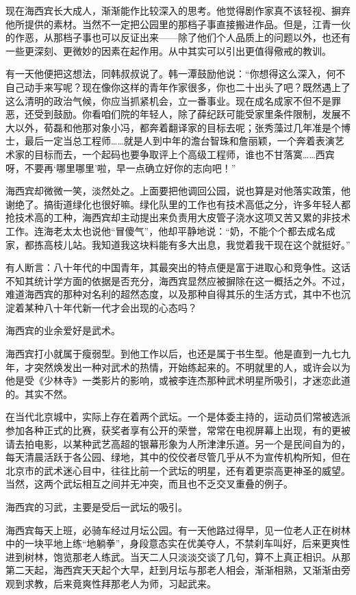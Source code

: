 \par 现在海西宾长大成人，渐渐能作比较深入的思考。他觉得剧作家真不该轻视、摒弃他所提供的素材。当然不一定把公园里的那档子事直接搬进作品。但是，江青一伙的作恶，从那档子事也可以反证出来——除了他们个人品质上的问题以外，也还有一些更深刻、更微妙的因素在起作用。从中其实可以引出更值得儆戒的教训。
\par 有一天他便把这想法，同韩叔叔说了。韩一潭鼓励他说：“你想得这么深入，何不自己动手来写呢？现在像你这样的青年作家很多，你也二十出头了吧？既然遇上了这么清明的政治气候，你应当抓紧机会，立一番事业。现在成名成家不但不是罪恶，还受到鼓励。你看咱们院的年轻人，除了薛纪跃可能受家里条件限制，发展不大以外，荀磊和他那对象小冯，都奔着翻译家的目标去呢；张秀藻过几年准是个博士，最后一定当总工程师……就是人到中年的澹台智珠和詹丽颖，一个奔着表演艺术家的目标而去，一个起码也要争取评上个高级工程师，谁也不甘落寞……西宾呀，不要再‘哪里哪里’啦，早一点确立好你的志向吧！”
\par 海西宾却微微一笑，淡然处之。上面要把他调回公园，说也算是对他落实政策，他谢绝了。搞街道绿化也很好嘛。绿化队里的工作也有技术高低之分，许多年轻人都抢技术高的工种，海西宾却主动提出来负责用大皮管子浇水这项又苦又累的非技术工作。连海老太太也说他“冒傻气”，他却平静地说：“奶，不能个个都去成名成家，都拣高枝儿站。我知道我这块料能有多大出息，我觉着我干现在这个就挺好。”
\par 有人断言：八十年代的中国青年，其最突出的特点便是富于进取心和竞争性。这话不知其统计学方面的依据是否充分，海西宾显然应被摒除在这一概括之外。不过，难道海西宾的那种对名利的超然态度，以及那种自得其乐的生活方式，其中不也沉淀着某种八十年代新一代才会出现的心态吗？
\par 海西宾的业余爱好是武术。
\par 海西宾打小就属于瘦弱型。到他工作以后，也还是属于书生型。他是直到一九七九年，才突然焕发出一种对武术的热情，开始练起来的。不明就里的人，或许会以为他是受《少林寺》一类影片的影响，或被李连杰那种武术明星所吸引，才迷恋此道的。其实不然。
\par 在当代北京城中，实际上存在着两个武坛。一个是体委主持的，运动员们常被选派参加各种正式的比赛，获奖者享有公开的荣誉，常常在电视屏幕上出现，有的更被请去拍电影，以某种武艺高超的银幕形象为人所津津乐道。另一个是民间自为的，每天清晨活跃于各公园、绿地，其中的佼佼者尽管几乎从不为宣传机构所知，但在北京市的武术迷心目中，往往比前一个武坛的明星，还有着更崇高更神圣的威望。当然，这两个武坛相互之间并无冲突，而且也不乏交叉重叠的例子。
\par 海西宾的习武，主要是受后一武坛的吸引。
\par 海西宾每天上班，必骑车经过月坛公园。有一天他路过得早，见一位老人正在树林中的一块平地上练“地躺拳”，身段意态实在优美夺人，不禁刹车叫好，后来更爽性进到树林，饱览那老人练武。当天二人只淡淡交谈了几句，算不上真正相识。从那第二天起，海西宾天天起个大早，赶到月坛与那老人相会，渐渐相熟，又渐渐由旁观到求教，后来竟爽性拜那老人为师，习起武来。
